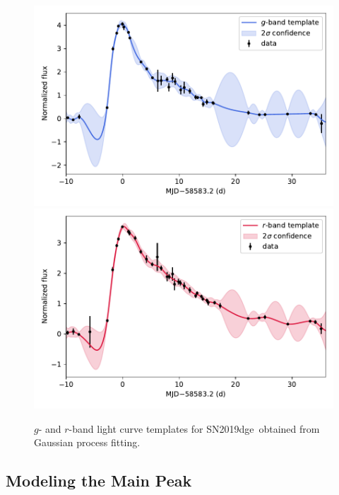 \documentclass[twocolumn]{aastex63}
\newcommand{\name}{SN2019dge}
\newcommand{\todo}[1]{{\color{magenta} to-do: {#1}}}
\begin{document}
\begin{figure}[htbp!]
	\centering
	\includegraphics[width=\columnwidth]{figures/template_g.pdf}
	\includegraphics[width=\columnwidth]{figures/template_r.pdf}
	\caption{$g$- and $r$-band light curve templates for \name\ obtained from Gaussian process 
	fitting. 	\label{fig:template}}
\end{figure}

\subsection{Modeling the Main Peak}\label{subsec:arnettfit}

\end{document}
